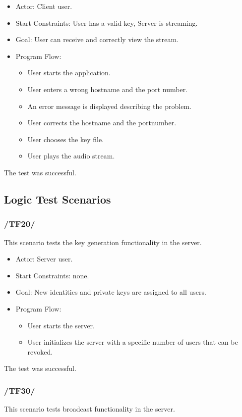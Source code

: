 \documentclass[a4paper,10pt]{scrartcl}
\begin{document}
\begin{itemize}
	\item Actor: Client user.
	\item Start Constraints: User has a valid key, Server is streaming.
	\item Goal: User can receive and correctly view the stream.
	\item Program Flow:
	\begin{itemize}
   \item User starts the application.
   \item User enters a wrong hostname and the port number.
   \item An error message is displayed describing the problem.
 	 \item User corrects the hostname and the portnumber.
	 \item User chooses the key file.
   \item User plays the audio stream.
\end{itemize}
\end{itemize}
The test was successful.

\subsection{Logic Test Scenarios}

\subsubsection{/TF20/}
This scenario tests the key generation functionality in the server.

\begin{itemize}
	\item Actor: Server user.
	\item Start Constraints: none.
	\item Goal: New identities and private keys are assigned to all users.
	\item Program Flow:
	\begin{itemize}
   \item User starts the server.
   \item User initializes the server with a specific number of users that can be revoked.
\end{itemize}
\end{itemize}
The test was successful.

\subsubsection{/TF30/}
This scenario tests broadcast functionality in the server.
\end{document}
